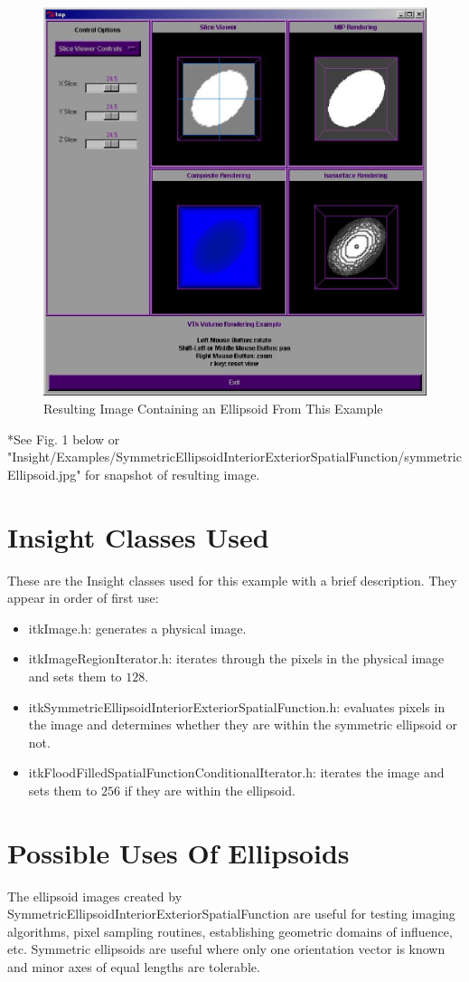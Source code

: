 \documentclass{InsightHowto}
\begin{document}
\begin{figure}[!hbp]
       \centering
       \includegraphics[width=.7\textwidth]{symmetricEllipsoid.eps}
       \caption{Resulting Image Containing an Ellipsoid From This Example \label{Fig. 1.} }
\end{figure}

*See Fig. 1 below or
"Insight/Examples/SymmetricEllipsoidInteriorExteriorSpatialFunction/symmetricEllipsoid.jpg"
for snapshot of resulting image.

\section{Insight Classes Used}

These are the Insight classes used for this example with a brief description. They appear in
order of first use:

\begin{itemize}
\item itkImage.h: generates a physical image.
\item itkImageRegionIterator.h: iterates through the pixels in the physical image and sets
them to $128$.
\item itkSymmetricEllipsoidInteriorExteriorSpatialFunction.h: evaluates pixels in the image and determines whether they are within the symmetric ellipsoid or
not.
\item itkFloodFilledSpatialFunctionConditionalIterator.h: iterates the image and sets them to $256$ if they are within the
ellipsoid.
\end{itemize}

\section{Possible Uses Of Ellipsoids}
The ellipsoid images created by SymmetricEllipsoidInteriorExteriorSpatialFunction are useful
for testing imaging algorithms, pixel sampling routines, establishing geometric domains of
influence, etc. Symmetric ellipsoids are useful where only one orientation vector is known
and minor axes of equal lengths are tolerable.
\end{document}
